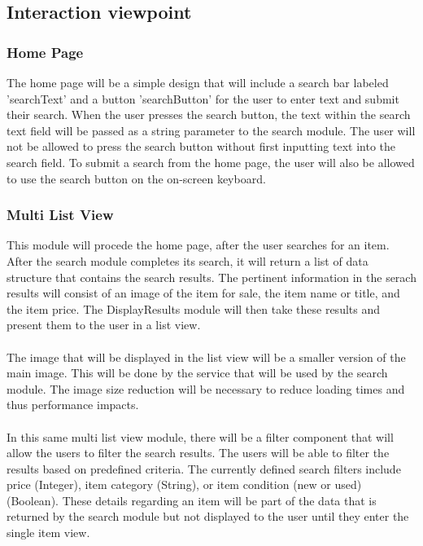 \documentclass[journal,compsoc, 10pt, draftclsnofoot, onecolumn]{IEEEtran}
\begin{document}
\subsection{Interaction viewpoint}

\subsubsection*{Home Page}
The home page will be a simple design that will include a search bar labeled 
'searchText' and a button 'searchButton' for the user to enter text and 
submit their search. When the user presses the search button, the text within 
the search text field will be passed as a string parameter to the search module.
The user will not be allowed to press the search button without first inputting 
text into the search field. To submit a search from the home page, the user will 
also be allowed to use the search button on the on-screen keyboard. 

\subsubsection*{Multi List View}
This module will procede the home page, after the user searches for an item. 
After the search module completes its search, it will return a list of data 
structure that contains the search results. The pertinent information in the 
serach results will consist of an image of the item for sale, the item name or 
title, and the item price. The DisplayResults module will then take these 
results and present them to the user in a list view. 
\\\\
The image that will be displayed in the list view will be a smaller version of 
the main image. This will be done by the service that will be used by the 
search module. The image size reduction will be necessary to reduce loading 
times and thus performance impacts.
\\\\
In this same multi list view module, there will be a filter component that will
 allow the users to filter the search results. The users will be able to filter 
the results based on predefined criteria. The currently defined search filters 
include price (Integer), item category (String), or item condition (new or used) 
(Boolean). These details regarding an item will be part of the data that is 
returned by the search module but not displayed to the user until they enter 
the single item view.
\end{document}
